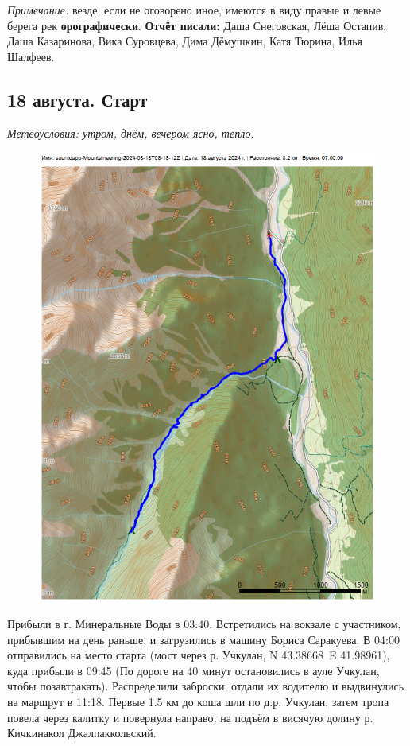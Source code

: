 \textit{Примечание:} везде, если не оговорено иное, имеются в виду правые и левые берега рек \textbf{орографически}.
\textbf{Отчёт писали:} Даша Снеговская, Лёша Остапив, Даша Казаринова, Вика Суровцева, Дима Дёмушкин, Катя Тюрина, Илья Шалфеев.
\subsection{18 августа. Старт}
\textit{Метеоусловия: утром, днём, вечером ясно, тепло.}

\begin{figure}[h!]
	\centering
	\includegraphics[angle=0, width=0.7\linewidth]{../pics/mini_maps/18}
	\label{fig:mini_18}
\end{figure}

Прибыли в г. Минеральные Воды в 03:40. Встретились на вокзале с участником, прибывшим на день раньше, и загрузились в машину Бориса Саракуева. В 04:00 отправились на место старта (мост через р. Учкулан, N 43.38668\degree~E 41.98961\degree), куда прибыли в 09:45 (По дороге на 40 минут остановились в ауле Учкулан, чтобы позавтракать). Распределили заброски, отдали их водителю и выдвинулись на маршрут в 11:18. Первые 1.5 км до коша шли по д.р. Учкулан, затем тропа повела через калитку и повернула направо, на подъём в висячую долину р. Кичкинакол Джалпаккольский.

